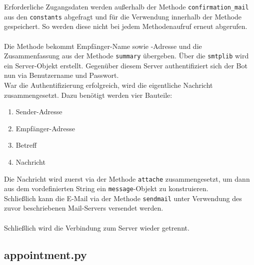                 Erforderliche Zugangsdaten werden außerhalb der Methode \verb|confirmation_mail| aus den \verb|constants| abgefragt und für die Verwendung innerhalb der Methode gespeichert. So werden diese nicht bei jedem Methodenaufruf erneut abgerufen.\\
                \\
                Die Methode bekommt Empfänger-Name sowie -Adresse und die Zusammenfassung aus der Methode \verb|summary| übergeben. Über die \verb|smtplib| wird ein Server-Objekt erstellt. Gegenüber diesem Server authentifiziert sich der Bot nun via Benutzername und Passwort.\\
                War die Authentifizierung erfolgreich, wird die eigentliche Nachricht zusammengesetzt. Dazu benötigt werden vier Bauteile: 
                \begin{enumerate}
                    \item Sender-Adresse
                    \item Empfänger-Adresse
                    \item Betreff
                    \item Nachricht
                \end{enumerate}
                Die Nachricht wird zuerst via der Methode \verb|attache| zusammengesetzt, um dann aus dem vordefinierten String ein \verb|message|-Objekt zu konstruieren.\\
                Schließlich kann die E-Mail via der Methode \verb|sendmail| unter Verwendung des zuvor beschriebenen Mail-Servers versendet werden.\\
                \\
                Schließlich wird die Verbindung zum Server wieder getrennt.


        \subsection{appointment.py} \label{Implementierung: appointment.py}

